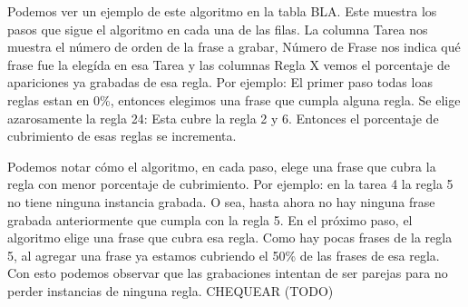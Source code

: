Podemos ver un ejemplo de este algoritmo en la tabla BLA. Este muestra los pasos que sigue el algoritmo en cada una de las filas. La columna Tarea nos muestra el número de orden de la frase a grabar, Número de Frase nos indica qué frase fue la elegída en esa Tarea y las columnas Regla X vemos el porcentaje de apariciones ya grabadas de esa regla. Por ejemplo: El primer paso todas loas reglas estan en 0\%, entonces elegimos una frase que cumpla alguna regla. Se elige azarosamente la regla 24: Esta cubre la regla 2 y 6. Entonces el porcentaje de cubrimiento de esas reglas se incrementa.

Podemos notar cómo el algoritmo, en cada paso, elege una frase que cubra la regla con menor porcentaje de cubrimiento. Por ejemplo: en la tarea 4 la regla 5 no tiene ninguna instancia grabada. O sea, hasta ahora no hay ninguna frase grabada anteriormente que cumpla con la regla 5. En el próximo paso, el algoritmo elige una frase que cubra esa regla. Como hay pocas frases de la regla 5, al agregar una frase ya estamos cubriendo el 50\% de las frases de esa regla. Con esto podemos observar que las grabaciones intentan de ser parejas para no perder instancias de ninguna regla. CHEQUEAR (TODO)

